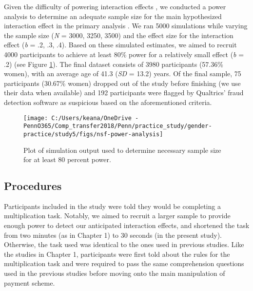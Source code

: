\documentclass[letterpaper, nobind]{templates/ociamthesis}
\begin{document}
\newpage

Given the difficulty of powering interaction effects \autocites[see][]{Simonsohn2014,Giner-Sorolla2018}, we conducted a power analysis to determine an adequate sample size for the main hypothesized interaction effect in the primary analysis \autocite[simulations modeled after code from][]{Hughes2017a}. We ran 5000 simulations while varying the sample size (\emph{N} = 3000, 3250, 3500) and the effect size for the interaction effect (\emph{b} = .2, .3, .4). Based on these simulated estimates, we aimed to recruit 4000 participants to achieve at least 80\% power for a relatively small effect (\emph{b} = .2) (see Figure \ref{fig:power-analysis-study5}). The final dataset consists of 3980 participants (57.36\% women), with an average age of 41.3 (\emph{SD} = 13.2) years. Of the final sample, 75 participants (30.67\% women) dropped out of the study before finishing (we use their data when available) and 192 participants were flagged by Qualtrics' fraud detection software as suspicious based on the aforementioned criteria.

\begin{figure}

{\centering \texttt{[image: C:/Users/keana/OneDrive - PennO365/Comp\_transfer2018/Penn/practice\_study/gender-practice/study5/figs/nsf-power-analysis]} 

}

\caption{Plot of simulation output used to determine necessary sample size for at least 80 percent power.}\label{fig:power-analysis-study5}
\end{figure}

\hypertarget{procedures-3}{%
\subsection{Procedures}\label{procedures-3}}

Participants included in the study were told they would be completing a multiplication task. Notably, we aimed to recruit a larger sample to provide enough power to detect our anticipated interaction effects, and shortened the task from two minutes (as in Chapter 1) to 30 seconds (in the present study). Otherwise, the task used was identical to the ones used in previous studies. Like the studies in Chapter 1, participants were first told about the rules for the multiplication task and were required to pass the same comprehension questions used in the previous studies before moving onto the main manipulation of payment scheme.
\end{document}
